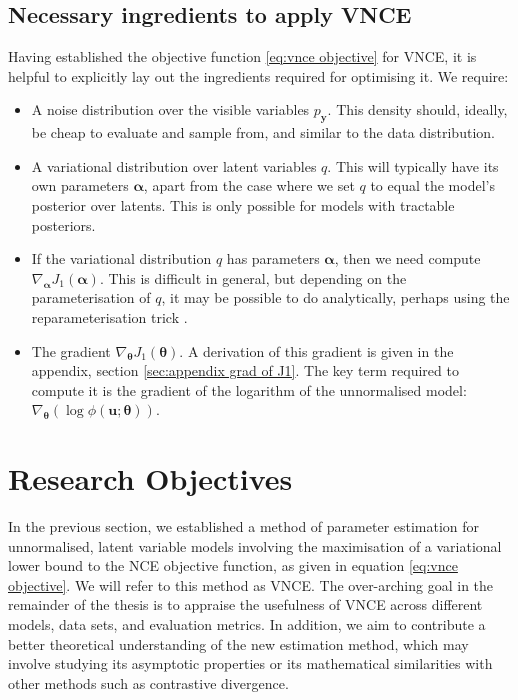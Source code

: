 \documentclass[11pt, oneside]{article}
\newcommand{\thetab}{{\boldsymbol{\theta}}}
\newcommand{\alphab}{{\boldsymbol{\alpha}}}
\newcommand{\pnoise}{p_{ \mathbf y}}
\renewcommand{\u}{{\mathbf u}}
\theoremstyle{definition}
\begin{document}
\subsection{Necessary ingredients to apply VNCE}
\label{sec:optimisation of var objective}
Having established the objective function \ref{eq:vnce objective} for VNCE, it is helpful to explicitly lay out the ingredients required for optimising it. We require:
\begin{itemize}
    \item A noise distribution over the visible variables $\pnoise$. This density should, ideally, be cheap to evaluate and sample from, and similar to the data distribution.
    \item A variational distribution over latent variables $q$. This will typically have its own parameters $\alphab$, apart from the case where we set $q$ to equal the model's posterior over latents. This is only possible for models with tractable posteriors. 
    \item If the variational distribution $q$ has parameters $\alphab$, then we need compute $\nabla_{\alphab} J_1(\alphab)$. This is difficult in general, but depending on the parameterisation of $q$, it may be possible to do analytically, perhaps using the reparameterisation trick \citep{kingma2015variational}.
    \item The gradient $\nabla_{\thetab} J_1(\thetab)$. A derivation of this gradient is given in the appendix, section \ref{sec:appendix grad of J1}. The key term required to compute it is the gradient of the logarithm of the unnormalised model: $\nabla_{\thetab}(\log \phi(\u; \thetab))$.
\end{itemize}


\newpage
\section{Research Objectives}
\label{sec:research objectives}
In the previous section, we established a method of parameter estimation for unnormalised, latent variable models involving the maximisation of a variational lower bound to the NCE objective function, as given in equation \ref{eq:vnce objective}. We will refer to this method as VNCE. The over-arching goal in the remainder of the thesis is to appraise the usefulness of VNCE across different models, data sets, and evaluation metrics. In addition, we aim to contribute a better theoretical understanding of the new estimation method, which may involve studying its asymptotic properties or its mathematical similarities with other methods such as contrastive divergence.
\end{document}
